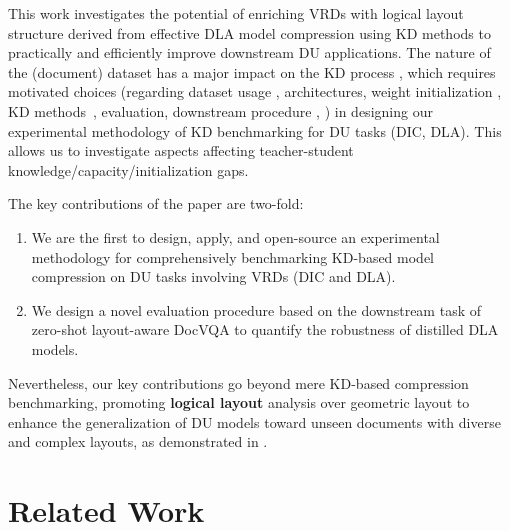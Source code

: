 \documentclass[runningheads]{llncs}
\begin{document}
This work investigates the potential of enriching VRDs with logical layout structure derived from effective DLA model compression using KD methods to practically and efficiently improve downstream DU applications.
The nature of the (document) dataset has a major impact on the KD process \cite{stanton2021does}, which requires motivated choices (regarding dataset usage \cite{pfitzmann2022doclaynet,
    antonacopoulos2009realistic,
    harley2015evaluation}, architectures, weight initialization \cite{li2022dit}, KD methods~\cite{SimKD, he2021distilling, chen2021distilling, zhang2020distilling, hsieh2023distilling,hinton2015distilling}, evaluation, downstream procedure \cite{wang2023layout}, \etc) in designing our experimental methodology of KD benchmarking for DU tasks (DIC, DLA). This allows us to investigate aspects affecting teacher-student knowledge/capacity/initialization gaps. 

    

\noindent The key contributions of the paper are two-fold:
\begin{enumerate}
    [label=\Roman*.,leftmargin=2\parindent]
    \item  We are the first to design, apply, and open-source an experimental methodology for comprehensively benchmarking KD-based model compression on DU tasks involving VRDs (DIC and DLA).
    \item  We design a novel evaluation procedure based on the downstream task of zero-shot layout-aware DocVQA to quantify the robustness of distilled DLA models.
\end{enumerate}

\noindent Nevertheless, our key contributions go beyond mere KD-based compression benchmarking, promoting \textbf{logical layout} analysis over geometric layout to enhance the generalization of DU models toward unseen documents with diverse and complex layouts, as demonstrated in .

\section{Related Work}
\end{document}
